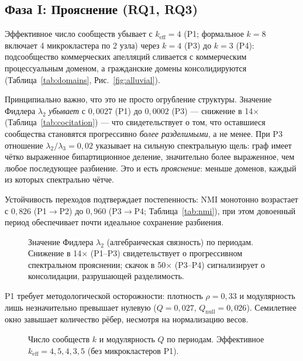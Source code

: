 \documentclass[11pt]{article}
\begin{document}
\subsection{Фаза I: Прояснение (RQ1, RQ3)}

Эффективное число сообществ убывает с $k_{\text{eff}} = 4$ (P1; формальное $k=8$ включает 4 микрокластера по 2 узла) через $k=4$ (P3) до $k=3$ (P4): подсообщество коммерческих апелляций сливается с коммерческим процессуальным доменом, а гражданские домены консолидируются (Таблица~\ref{tab:domains}, Рис.~\ref{fig:alluvial}).

Принципиально важно, что это не просто огрубление структуры.
Значение Фидлера $\lambda_2$ \emph{убывает} с $0{,}0027$ (P1) до $0{,}0002$ (P3) --- снижение в 14$\times$ (Таблица~\ref{tab:cocitation}) --- что свидетельствует о том, что оставшиеся сообщества становятся прогрессивно \emph{более разделимыми}, а не менее.
При P3 отношение $\lambda_2/\lambda_3 = 0{,}02$ указывает на сильную спектральную щель: граф имеет чётко выраженное бипартиционное деление, значительно более выраженное, чем любое последующее разбиение.
Это и есть \emph{прояснение}: меньше доменов, каждый из которых спектрально чётче.

Устойчивость переходов подтверждает постепенность: NMI монотонно возрастает с $0{,}826$ (P1$\to$P2) до $0{,}960$ (P3$\to$P4; Таблица~\ref{tab:nmi}), при этом довоенный период обеспечивает почти идеальное сохранение разбиения.

\begin{figure}[t]
\centering

\caption{Значение Фидлера $\lambda_2$ (алгебраическая связность) по периодам. Снижение в 14$\times$ (P1--P3) свидетельствует о прогрессивном спектральном прояснении; скачок в 50$\times$ (P3--P4) сигнализирует о консолидации, разрушающей разделимость.}
\label{fig:spectral}
\end{figure}

P1 требует методологической осторожности: плотность $\rho = 0{,}33$ и модулярность лишь незначительно превышает нулевую ($Q = 0{,}027$, $Q_{\text{null}} = 0{,}026$).
Семилетнее окно завышает количество рёбер, несмотря на нормализацию весов.

\begin{figure}[t]
\centering

\caption{Число сообществ $k$ и модулярность $Q$ по периодам. Эффективное $k_{\text{eff}} = 4, 5, 4, 3, 5$ (без микрокластеров P1).}
\label{fig:period_summary}
\end{figure}
\end{document}
